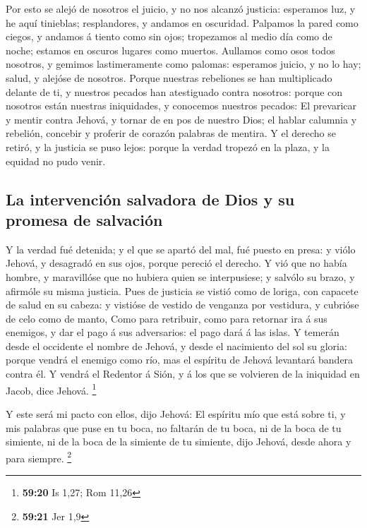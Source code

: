  Por esto se alejó de nosotros el juicio, y no nos alcanzó
justicia: esperamos luz, y he aquí tinieblas; resplandores, y andamos en
oscuridad.  Palpamos la pared como ciegos, y andamos á
tiento como sin ojos; tropezamos al medio día como de noche; estamos en
oscuros lugares como muertos.  Aullamos como osos todos
nosotros, y gemimos lastimeramente como palomas: esperamos juicio, y no
lo hay; salud, y alejóse de nosotros.  Porque nuestras
rebeliones se han multiplicado delante de ti, y nuestros pecados han
atestiguado contra nosotros: porque con nosotros están nuestras
iniquidades, y conocemos nuestros pecados:  El prevaricar
y mentir contra Jehová, y tornar de en pos de nuestro Dios; el hablar
calumnia y rebelión, concebir y proferir de corazón palabras de mentira.
 Y el derecho se retiró, y la justicia se puso lejos:
porque la verdad tropezó en la plaza, y la equidad no pudo venir.

\hypertarget{la-intervenciuxf3n-salvadora-de-dios-y-su-promesa-de-salvaciuxf3n}{%
\subsection{La intervención salvadora de Dios y su promesa de
salvación}\label{la-intervenciuxf3n-salvadora-de-dios-y-su-promesa-de-salvaciuxf3n}}

 Y la verdad fué detenida; y el que se apartó del mal,
fué puesto en presa: y viólo Jehová, y desagradó en sus ojos, porque
pereció el derecho.  Y vió que no había hombre, y
maravillóse que no hubiera quien se interpusiese; y salvólo su brazo, y
afirmóle su misma justicia.  Pues de justicia se vistió
como de loriga, con capacete de salud en su cabeza: y vistióse de
vestido de venganza por vestidura, y cubrióse de celo como de manto,
 Como para retribuir, como para retornar ira á sus
enemigos, y dar el pago á sus adversarios: el pago dará á las islas.
 Y temerán desde el occidente el nombre de Jehová, y
desde el nacimiento del sol su gloria: porque vendrá el enemigo como
río, mas el espíritu de Jehová levantará bandera contra él.
 Y vendrá el Redentor á Sión, y á los que se volvieren de
la iniquidad en Jacob, dice Jehová. \footnote{\textbf{59:20} Is 1,27;
  Rom 11,26}

 Y este será mi pacto con ellos, dijo Jehová: El espíritu
mío que está sobre ti, y mis palabras que puse en tu boca, no faltarán
de tu boca, ni de la boca de tu simiente, ni de la boca de la simiente
de tu simiente, dijo Jehová, desde ahora y para siempre. \footnote{\textbf{59:21}
  Jer 1,9}

